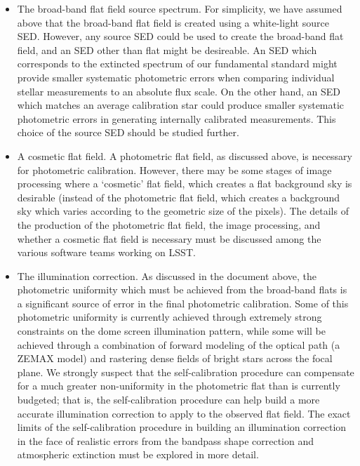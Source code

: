 \documentclass[12pt,preprint]{aastex}
\begin{document}
\begin{itemize}

\item{The broad-band flat field source spectrum. For simplicity, we have assumed above
    that the broad-band flat field is created using a white-light
    source SED. However, any source SED could be used to create the
    broad-band flat field, and an SED other than flat might be
    desireable. An SED which corresponds to the extincted
    spectrum of our fundamental standard might provide smaller systematic
    photometric errors when comparing individual stellar measurements
    to an absolute flux scale. On the other hand, an SED which matches
    an average calibration star could produce smaller systematic
    photometric errors in generating internally calibrated
    measurements. This choice of the source SED should be studied
    further. }

\item{A cosmetic flat field. A photometric flat field, as discussed above, is
    necessary for photometric calibration. However, there may be some
    stages of image processing where a `cosmetic' flat field, which
    creates a flat background sky is desirable (instead of the photometric flat
    field, which creates a background sky which varies according to
    the geometric size of the pixels). The details of the production
    of the photometric flat field, the image processing, and whether a
    cosmetic flat field is necessary must be discussed among the
    various software teams working on LSST.}

\item{The illumination correction. As discussed in the document above, the
    photometric uniformity which must be achieved from the broad-band
    flats is a significant source of error in the final photometric
    calibration. Some of this photometric uniformity is currently
    achieved through extremely strong constraints on the dome screen
    illumination pattern, while some will be achieved through a
    combination of forward modeling of the optical path (a ZEMAX
    model) and rastering dense fields of bright stars across the focal
    plane. We strongly suspect that the self-calibration procedure can
    compensate for a much greater non-uniformity in the photometric
    flat than is currently budgeted; that is, the self-calibration
    procedure can help build a more accurate illumination correction
    to apply to the observed flat field. The exact limits of the
    self-calibration procedure in building an illumination correction in the face of realistic errors from
    the bandpass shape correction and atmospheric extinction must be
    explored in more detail. }


\end{itemize}
\end{document}
